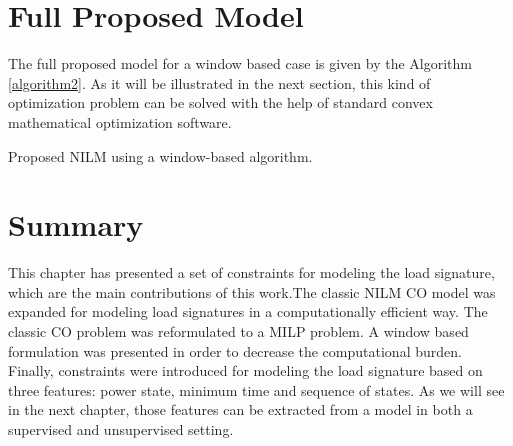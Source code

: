 \section{Full Proposed Model}

The full proposed model for a window based case is given by the Algorithm \ref{algorithm2}. As it will be illustrated in the next section, this kind of optimization problem can be solved with the help of standard convex mathematical optimization software. 

\begin{algorithm}[htb]\label{algorithm2}
\SetAlgoLined
\caption{Proposed NILM using a window-based algorithm.}
\end{algorithm}

\vfill


\section{Summary}
This chapter has presented a set of constraints for modeling the load signature, which are the main contributions of this work.The classic NILM CO model was expanded for modeling load signatures in a computationally efficient way. The classic CO problem was reformulated to a MILP problem. A window based formulation was presented in order to decrease the computational burden. Finally, constraints were introduced for modeling the load signature based on three features: power state, minimum time and sequence of states. As we will see in the next chapter, those features can be extracted from a model in both a supervised and unsupervised setting. 